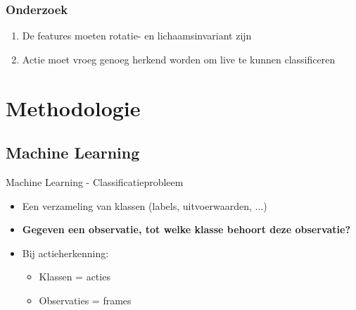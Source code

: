\documentclass[]{beamer}
\begin{document}
	\begin{frame}\frametitle{Onderzoek}
		\begin{enumerate}
			\item De features moeten rotatie- en lichaamsinvariant zijn
			\item Actie moet vroeg genoeg herkend worden om live te kunnen classificeren
		\end{enumerate}
	\end{frame}


	\section{Methodologie}
	\subsection{Machine Learning}
	\begin{frame}{Machine Learning - Classificatieprobleem}
			\begin{itemize}
				\item Een verzameling van klassen (labels, uitvoerwaarden, ...)
				\item \textbf{Gegeven een observatie, tot welke klasse behoort deze observatie?}
				\item Bij actieherkenning:
				\begin{itemize}
					\item Klassen = acties
					\item Observaties = frames
				\end{itemize}
			\end{itemize}

	\end{frame}
	
\end{document}
